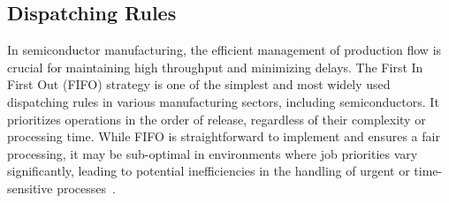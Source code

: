 



\subsection{Dispatching Rules}

In semiconductor manufacturing, the efficient management of production flow is crucial for maintaining high throughput and minimizing delays. %
%
The First In First Out (FIFO) strategy is one of the simplest and most widely used dispatching rules in various manufacturing sectors, including semiconductors. It prioritizes operations in the order of release, regardless of their complexity or processing time. While FIFO is straightforward to implement and ensures a fair processing, it may be sub-optimal in environments where job priorities vary significantly, leading to potential inefficiencies in the handling of urgent or time-sensitive processes~\cite{kumar1993}.

